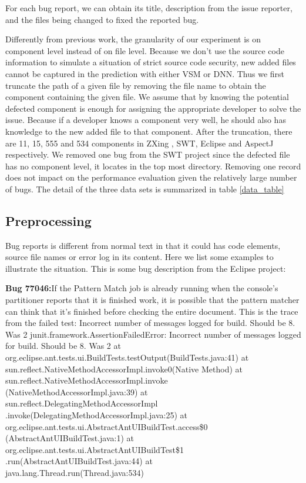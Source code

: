 For each bug report, we can obtain its title, description from the issue reporter, and the files being changed to fixed the reported bug. 

Differently from previous work, the granularity of our experiment is on component level instead of on file level. 
Because we don't use the source code information to simulate a situation of strict source code security, new added files cannot be captured in the prediction with either VSM or DNN.
Thus we first truncate the path of a given file by removing the file name to obtain the component containing the given file. 
We assume that by knowing the potential defected component is enough for assigning the appropriate developer to solve the issue.
Because if a developer knows a component very well, he should also has knowledge to the new added file to that component.
After the truncation, there are 11, 15, 555 and 534 components in ZXing , SWT, Eclipse and AspectJ respectively. 
We removed one bug from the SWT project since the defected file has no component level, it locates in the top most directory. 
Removing one record does not impact on the performance evaluation given the relatively large number of bugs. 
The detail of the three data sets is summarized in table \ref{data_table}

\subsection{Preprocessing}
Bug reports is different from normal text in that it could has code elements, source file names or error log in its content. 
Here we list some examples to illustrate the situation. 
This is some bug description from the Eclipse project:

\textbf{Bug 77046:}If the Pattern Match job is already running when the console's partitioner reports that it is finished work, it is possible that the pattern matcher can think that it's finished before checking the entire document. This is the trace from the failed test: Incorrect number of messages logged for build. Should be 8. Was 2 junit.framework.AssertionFailedError: Incorrect number of messages logged for build. Should be 8. Was 2 at\\ org.eclipse.ant.tests.ui.BuildTests.testOutput(BuildTests.java:41) at\\ sun.reflect.NativeMethodAccessorImpl.invoke0(Native Method) at\\ sun.reflect.NativeMethodAccessorImpl.invoke\\(NativeMethodAccessorImpl.java:39) at\\ sun.reflect.DelegatingMethodAccessorImpl\\.invoke(DelegatingMethodAccessorImpl.java:25) at\\ org.eclipse.ant.tests.ui.AbstractAntUIBuildTest.access\$0\\(AbstractAntUIBuildTest.java:1) at\\ org.eclipse.ant.tests.ui.AbstractAntUIBuildTest\$1\\.run(AbstractAntUIBuildTest.java:44) at\\ java.lang.Thread.run(Thread.java:534)



